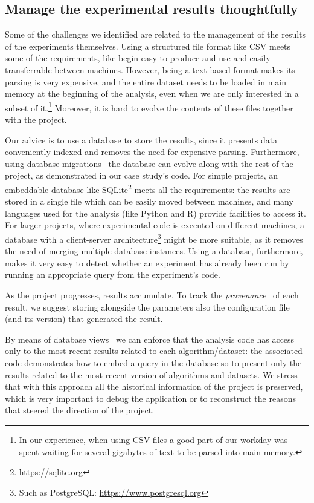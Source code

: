 \documentclass{llncs}
\begin{document}
\subsection{Manage the experimental results thoughtfully}
\label{sec:manage-experiments}

Some of the challenges we identified are related to the management of the results
of the experiments themselves.
Using a structured file format like CSV meets some of the requirements, like begin
easy to produce and use and easily transferrable between machines.
However, being a text-based format makes its parsing is very expensive, and
the entire dataset needs to be loaded in main memory at the beginning
of the analysis, even when we are only interested in a subset of it.\footnote{
  In our experience, when using CSV files a good part of our workday was spent 
  waiting for several gigabytes of text to be parsed into main memory.
}
Moreover, it is hard to evolve the contents of these files together with 
the project.

Our advice is to use a database to store the results, since it presents data 
conveniently indexed and removes the need for expensive parsing. Furthermore,
using database migrations~\cite{citation-needed} the database can evolve along with
the rest of the project, as demonstrated in our case study's code.
For simple projects, an embeddable database like SQLite\footnote{\url{https://sqlite.org}}
meets all the requirements: the results are stored in a single file which can be easily moved
between machines, and many languages used for the analysis (like Python and R) provide
facilities to access it.
For larger projects, where experimental code is executed on different machines, a database with
a client-server architecture\footnote{Such as PostgreSQL: \url{https://www.postgresql.org}} 
might be more suitable, as it removes the need of 
merging multiple database instances.
Using a database, furthermore, makes it very easy to detect whether 
an experiment has already been run by running an appropriate query from the experiment's code.

As the project progresses, results accumulate. To track the
\emph{provenance}~\cite{BunemanKW01} of each result, we suggest storing alongside
the parameters also the configuration file (and its version) that generated the result.

By means of database views~\cite{citation-needed} we can enforce that the analysis code
has access only to the most recent results related to each algorithm/dataset: the associated code
demonstrates how to embed a query in the database so to present only the results related to 
the most recent version of algorithms and datasets.
We stress that with this approach all the historical information of the project is preserved,
which is very important to debug the application or to reconstruct the reasons that
steered the direction of the project.
\end{document}
